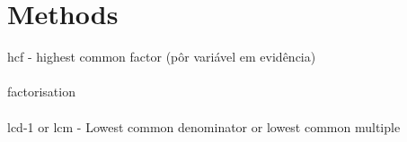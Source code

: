\section{Methods}
\acs{hcf} - highest common factor (pôr variável em evidência) 
\\
\\
\acl{factorisation} 
\\
\\
\acs{lcd-1} or \acs{lcm} - Lowest common denominator or lowest common multiple

